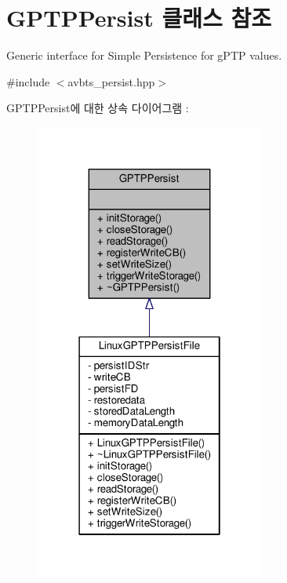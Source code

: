 \hypertarget{class_g_p_t_p_persist}{}\section{G\+P\+T\+P\+Persist 클래스 참조}
\label{class_g_p_t_p_persist}


Generic interface for Simple Persistence for g\+P\+TP values.  




{\ttfamily \#include $<$avbts\+\_\+persist.\+hpp$>$}



G\+P\+T\+P\+Persist에 대한 상속 다이어그램 \+: 
\nopagebreak
\begin{figure}[H]
\begin{center}
\leavevmode
\includegraphics[width=214pt]{class_g_p_t_p_persist__inherit__graph}
\end{center}
\end{figure}


